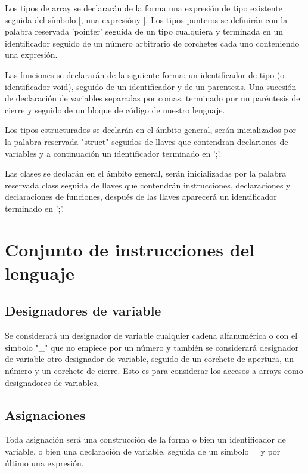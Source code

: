 \documentclass{article}
\begin{document}
\noindent Los tipos de array se declararán de la forma una expresión de tipo existente seguida del símbolo [, una expresión\footnotemark[1] y ]. Los tipos punteros se definirán con la palabra reservada 'pointer' seguida de un tipo cualquiera y terminada en un identificador seguido de un número arbitrario de corchetes cada uno conteniendo una expresión.

\noindent Las funciones se declararán de la siguiente forma: un identificador de tipo (o identificador void), seguido de un identificador y de un parentesis. Una sucesión de declaración de variables separadas por comas, terminado por un paréntesis de cierre y seguido de un bloque de código de nuestro lenguaje.

\noindent Los tipos estructurados se declarán en el ámbito general, serán inicializados por la palabra reservada "struct"  seguidos de llaves que contendran declariones de variables y a continuación un identificador terminado en ';'.

\noindent Las clases se declarán en el ámbito general, serán inicializadas por la palabra reservada class seguida de llaves que contendrán instrucciones, declaraciones y declaraciones de funciones, después de las llaves aparecerá un identificador terminado en ';'.

\section{Conjunto de instrucciones del lenguaje}

\subsection{Designadores de variable}
Se considerará un designador de variable cualquier cadena alfanumérica o con el simbolo "\_" que no empiece por un número y también se considerará designador de variable otro designador de variable, seguido de un corchete de apertura, un número y un corchete de cierre. Esto es para considerar los accesos a arrays como designadores de variables.

\subsection{Asignaciones}
Toda asignación será una construcción de la forma o bien un identificador de variable, o bien una declaración de variable, seguida de un simbolo = y por último una expresión.
\end{document}
